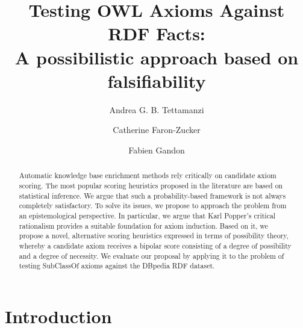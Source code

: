 \documentclass{llncs}
\begin{document}
\title{Testing OWL Axioms Against RDF Facts:\\
A possibilistic approach based on falsifiability}
%
%
\author{Andrea G. B. Tettamanzi \and Catherine Faron-Zucker \and Fabien Gandon}
%
%
%


\maketitle

\begin{abstract} %
Automatic knowledge base enrichment methods rely critically on candidate axiom scoring.
The most popular scoring heuristics proposed in the literature are based on statistical inference.
We argue that such a probability-based framework is not always completely satisfactory.
To solve its issues, we propose to approach the problem from an epistemological perspective.
In particular, we argue that Karl Popper's critical rationalism provides a suitable
foundation for axiom induction. Based on it, we propose a novel, alternative scoring
heuristics expressed in terms of possibility theory, whereby a candidate axiom receives
a bipolar score consisting of a degree of possibility and a degree of necessity.
We evaluate our proposal by applying it to the problem of testing \textsf{SubClassOf}
axioms against the DBpedia RDF dataset.

\end{abstract}

\section{Introduction}
\end{document}
